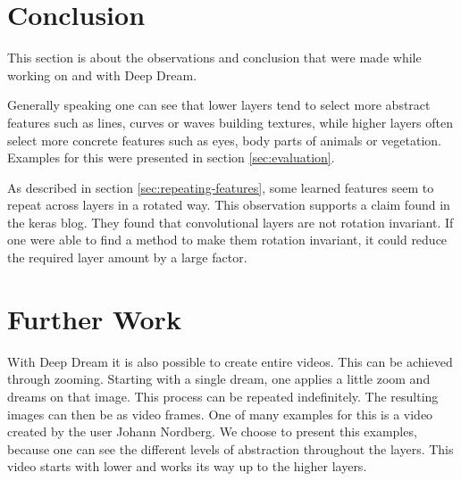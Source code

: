 \section{Conclusion}
\label{sec:conclusion}
This section is about the observations and conclusion that were made while working on and with Deep Dream.

Generally speaking one can see that lower layers tend to select more abstract features such as lines, curves or waves building textures, while higher layers often select more concrete features such as eyes, body parts of animals or vegetation. Examples for this were presented in section \ref{sec:evaluation}.

As described in section \ref{sec:repeating-features}, some learned features seem to repeat across layers in a rotated way.
This observation supports a claim found in the keras blog.\cite{keras-blog}
They found that convolutional layers are not rotation invariant.
If one were able to find a method to make them rotation invariant, it could reduce the required layer amount by a large factor.


\section{Further Work}
With Deep Dream it is also possible to create entire videos.
This can be achieved through zooming.
Starting with a single dream, one applies a little zoom and dreams on that image. This process can be repeated indefinitely.
The resulting images can then be as video frames.
One of many examples for this is a video created by the user Johann Nordberg.\cite{https://vimeo.com/132700334}
We choose to present this examples, because one can see the different levels of abstraction throughout the layers.
This video starts with lower and works its way up to the higher layers.



